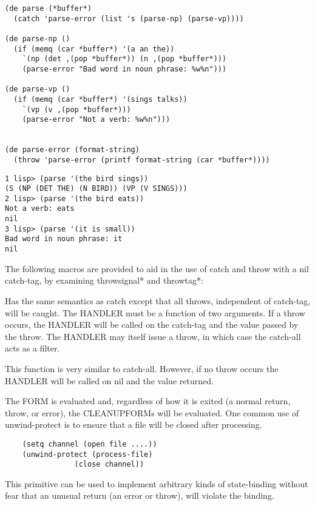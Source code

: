 \begin{verbatim}
(de parse (*buffer*)
  (catch 'parse-error (list 's (parse-np) (parse-vp))))

(de parse-np ()
  (if (memq (car *buffer*) '(a an the))
    `(np (det ,(pop *buffer*)) (n ,(pop *buffer*)))
    (parse-error "Bad word in noun phrase: %w%n")))

(de parse-vp ()
  (if (memq (car *buffer*) '(sings talks))
    `(vp (v ,(pop *buffer*)))
    (parse-error "Not a verb: %w%n")))


(de parse-error (format-string)
  (throw 'parse-error (printf format-string (car *buffer*))))
\end{verbatim}
\begin{verbatim}
1 lisp> (parse '(the bird sings))
(S (NP (DET THE) (N BIRD)) (VP (V SINGS)))
2 lisp> (parse '(the bird eats))
Not a verb: eats
nil
3 lisp> (parse '(it is small))
Bad word in noun phrase: it
nil
\end{verbatim}
  The following macros are provided to aid in the use  of  catch
and  throw  with  a nil catch-tag, by examining throwsignal* and
throwtag*:


{    Has the same semantics as  catch  except  that  all  throws,
    independent  of catch-tag, will be caught.  The HANDLER must
    be a function of two arguments.   If  a  throw  occurs,  the
    HANDLER will be called on the catch-tag and the value passed
    by  the  throw.    The  HANDLER may itself issue a throw, in
    which case the catch-all acts as a filter.
}

{    This function is very similar to catch-all.  However, if  no
    throw occurs the HANDLER will be called on nil and the value
    returned.
}

{    The FORM is evaluated and, regardless of how it is exited (a
    normal  return,  throw,  or error), the CLEANUPFORMs will be
    evaluated.  One common use of unwind-protect  is  to  ensure
    that a file will be closed after processing.
}
\begin{verbatim}
    (setq channel (open file ....))
    (unwind-protect (process-file)
                (close channel))
\end{verbatim}
    This  primitive  can be used to implement arbitrary kinds of
    state-binding without fear that an unusual return (an  error
    or throw), will violate the binding.

